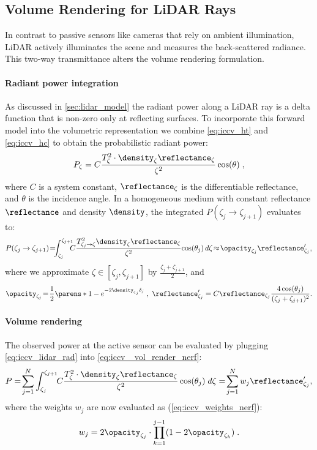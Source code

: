 \subsection{Volume Rendering for LiDAR Rays}
\label{sec:lidar_vr}
In contrast to passive sensors like cameras that rely on ambient illumination, LiDAR actively illuminates the scene and measures the back-scattered radiance. This two-way transmittance alters the volume rendering formulation. %

\paragraph{Radiant power integration}
As discussed in \cref{sec:lidar_model} 
the radiant power along a LiDAR ray is a delta function that is non-zero only at reflecting surfaces. To incorporate this forward model into the volumetric representation we combine \cref{eq:iccv_ht} and \cref{eq:iccv_hc} to obtain the 
probabilistic radiant power:
\begin{equation}
P_\zeta = C \frac{T^2_{\zeta} \cdot \density_\zeta  \reflectance_\zeta}{\zeta^2} \cos(\theta)\;,
\label{eq:iccv_radiance}
\end{equation}
where $C$ is a system constant, $\reflectance_\zeta$ is the differentiable reflectance, and $\theta$ is the incidence angle.
In a homogeneous medium with constant reflectance $\reflectance$ and density $\density$, the integrated $P(\zeta_j \rightarrow \zeta_{j+1})$ evaluates to:
\begin{equation}
     P(\zeta_j \rightarrow \zeta_{j+1}) 
     \!=\!\!\!\int_{\zeta_j}^{\zeta_{j+1}}\!\!\!\!C \frac{T^2_{\zeta_j \rightarrow \zeta} \density_\zeta \reflectance_\zeta}{\zeta^2}\!\cos(\theta_{j})\,d\zeta
     \!\approx\!\opacity_{\zeta_j} \reflectance_{\zeta_j}', 
\label{eq:iccv_lidar_rad}
\end{equation}
where we approximate $\zeta \in [\zeta_j, \zeta_{j+1}]$ by $\frac{\zeta_j + \zeta_{j+1}}{2}$, and 
\begin{equation}
    \opacity_{\zeta_j}\!=\!\frac{1}{2}\parens*{1- e^{-2\density_{\zeta_j}\delta_j}}\;,\; \reflectance_{\zeta_j}' = C \reflectance_{\zeta_j}\frac{4 \cos(\theta_j)}{(\zeta_j + \zeta_{j+1})^2}.
\end{equation}


\paragraph{Volume rendering}
The observed power at the active sensor can be evaluated by plugging \cref{eq:iccv_lidar_rad} into \cref{eq:iccv_ vol_render_nerf}: 
\begin{equation}
      P
      =\!\sum_{j=1}^N \int_{\zeta_j}^{\zeta_{j+1}}\!\!C \frac{T^2_{\zeta} \cdot \density_\zeta \reflectance_\zeta}{\zeta^2} \cos(\theta_j) \; d\zeta
      =\!\sum_{j=1}^N w_j \reflectance_{\zeta_j}',
\end{equation}
where the weights $w_j$ are now evaluated as (\cf \cref{eq:iccv_weights_nerf}):
\begin{equation}
   w_j = 2 \opacity_{\zeta_j} \cdot\prod_{k=1}^{j-1}(1 - 2 \opacity_{\zeta_k})\;.
\label{eq:iccv_lidar_weights}
\end{equation}
